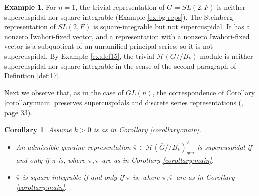 \documentclass[12pt,letterpaper,reqno]{amsart}
\let\cal\mathcal
\newtheorem{corollary}[theorem]{Corollary}
\theoremstyle{definition}
\newtheorem{example}[theorem]{Example}
\theoremstyle{remark}
\numberwithin{equation}{section}
\begin{document}
\begin{example}
\label{ex:def17}
For $n=1$, the trivial representation of $G=SL(2,F)$ is neither supercuspidal
nor square-integrable (Example \ref{ex:bg-reps}). The Steinberg
representation of $SL(2,F)$ is square-integrable but not supercuspidal. It has
a nonzero Iwahori-fixed vector, and a representation with a nonzero
Iwahori-fixed vector is a subquotient of an unramified principal series, so it
is not supercuspidal. By Example \ref{ex:def15}, the trivial
${\cal H}(G//B_k)$-module is neither supercuspidal nor square-integrable in
the sense of the second paragraph of Definition \ref{def:17}.
\end{example}

Next we observe that, as in the case of $GL(n)$, the correspondence of
Corollary \ref{corollary:main} preserves supercuspidals and discrete series
representations (\cite{HM85}, page 33).

\begin{corollary}
\label{cor:18}
Assume $k>0$ is as in Corollary \ref{corollary:main}.
\begin{itemize}
\item An admissible genuine representation
$\overline{\pi}\in {\cal H}(\overline{G}//B_k)_{gen}^\wedge$ is supercuspidal
if and only if $\pi$ is, where $\pi,\overline{\pi}$ are as in Corollary
\ref{corollary:main}.
\item $\overline{\pi}$ is square-integrable if and only if $\pi$ is, where
$\pi,\overline{\pi}$ are as in Corollary \ref{corollary:main}.
\end{itemize}
\end{corollary}
\end{document}
